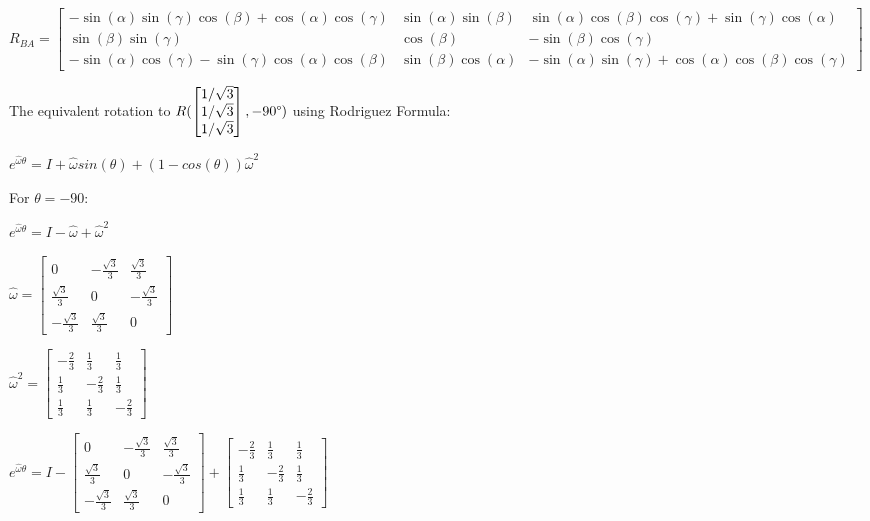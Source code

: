 \documentclass[12pt, letterpaper, oneside, notitlepage, onecolumn]{article}
\begin{document}
$R_{BA} = 
\left[\begin{matrix}- \sin{\left (\alpha \right )} \sin{\left (\gamma \right )} \cos{\left (\beta \right )} + \cos{\left (\alpha \right )} \cos{\left (\gamma \right )} & \sin{\left (\alpha \right )} \sin{\left (\beta \right )} & \sin{\left (\alpha \right )} \cos{\left (\beta \right )} \cos{\left (\gamma \right )} + \sin{\left (\gamma \right )} \cos{\left (\alpha \right )}\\\sin{\left (\beta \right )} \sin{\left (\gamma \right )} & \cos{\left (\beta \right )} & - \sin{\left (\beta \right )} \cos{\left (\gamma \right )}\\- \sin{\left (\alpha \right )} \cos{\left (\gamma \right )} - \sin{\left (\gamma \right )} \cos{\left (\alpha \right )} \cos{\left (\beta \right )} & \sin{\left (\beta \right )} \cos{\left (\alpha \right )} & - \sin{\left (\alpha \right )} \sin{\left (\gamma \right )} + \cos{\left (\alpha \right )} \cos{\left (\beta \right )} \cos{\left (\gamma \right )}\end{matrix}\right]$

The equivalent rotation to $R(\begin{bmatrix}1/\sqrt{3} \\ 1/\sqrt{3} \\ 1/\sqrt{3}\end{bmatrix}, -90 \degree)$ using Rodriguez Formula:

$e^{\hat{\omega} \theta} = I + \hat{\omega} sin(\theta) + (1 - cos(\theta) )\hat{\omega}^{2}$

For $\theta = -90$:

$e^{\hat{\omega} \theta} = I - \hat{\omega} + \hat{\omega}^{2}$

$\hat{\omega} = 
\left[\begin{matrix}0 & - \frac{\sqrt{3}}{3} & \frac{\sqrt{3}}{3}\\\frac{\sqrt{3}}{3} & 0 & - \frac{\sqrt{3}}{3}\\- \frac{\sqrt{3}}{3} & \frac{\sqrt{3}}{3} & 0\end{matrix}\right]$

$\hat{\omega}^{2} = 
\left[\begin{matrix}- \frac{2}{3} & \frac{1}{3} & \frac{1}{3}\\\frac{1}{3} & - \frac{2}{3} & \frac{1}{3}\\\frac{1}{3} & \frac{1}{3} & - \frac{2}{3}\end{matrix}\right]$

$e^{\hat{\omega} \theta} = I - 
\left[\begin{matrix}0 & - \frac{\sqrt{3}}{3} & \frac{\sqrt{3}}{3}\\\frac{\sqrt{3}}{3} & 0 & - \frac{\sqrt{3}}{3}\\- \frac{\sqrt{3}}{3} & \frac{\sqrt{3}}{3} & 0\end{matrix}\right]
 + 
\left[\begin{matrix}- \frac{2}{3} & \frac{1}{3} & \frac{1}{3}\\\frac{1}{3} & - \frac{2}{3} & \frac{1}{3}\\\frac{1}{3} & \frac{1}{3} & - \frac{2}{3}\end{matrix}\right]$
\end{document}

